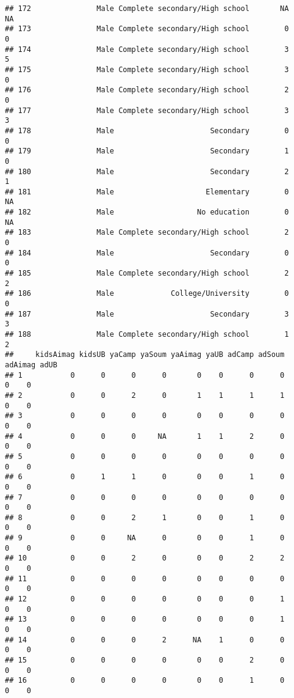 \documentclass[
]{article}
\begin{document}
\begin{verbatim}
## 172               Male Complete secondary/High school       NA       NA
## 173               Male Complete secondary/High school        0        0
## 174               Male Complete secondary/High school        3        5
## 175               Male Complete secondary/High school        3        0
## 176               Male Complete secondary/High school        2        0
## 177               Male Complete secondary/High school        3        3
## 178               Male                      Secondary        0        0
## 179               Male                      Secondary        1        0
## 180               Male                      Secondary        2        1
## 181               Male                     Elementary        0       NA
## 182               Male                   No education        0       NA
## 183               Male Complete secondary/High school        2        0
## 184               Male                      Secondary        0        0
## 185               Male Complete secondary/High school        2        2
## 186               Male             College/University        0        0
## 187               Male                      Secondary        3        3
## 188               Male Complete secondary/High school        1        2
##     kidsAimag kidsUB yaCamp yaSoum yaAimag yaUB adCamp adSoum adAimag adUB
## 1           0      0      0      0       0    0      0      0       0    0
## 2           0      0      2      0       1    1      1      1       0    0
## 3           0      0      0      0       0    0      0      0       0    0
## 4           0      0      0     NA       1    1      2      0       0    0
## 5           0      0      0      0       0    0      0      0       0    0
## 6           0      1      1      0       0    0      1      0       0    0
## 7           0      0      0      0       0    0      0      0       0    0
## 8           0      0      2      1       0    0      1      0       0    0
## 9           0      0     NA      0       0    0      1      0       0    0
## 10          0      0      2      0       0    0      2      2       0    0
## 11          0      0      0      0       0    0      0      0       0    0
## 12          0      0      0      0       0    0      0      1       0    0
## 13          0      0      0      0       0    0      0      1       0    0
## 14          0      0      0      2      NA    1      0      0       0    0
## 15          0      0      0      0       0    0      2      0       0    0
## 16          0      0      0      0       0    0      1      0       0    0

\end{verbatim}
\end{document}
